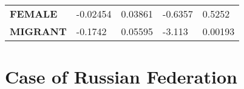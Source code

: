 \documentclass[]{article}
\begin{document}
\begin{longtable}[]{@{}lllll@{}}
\begin{minipage}[t]{0.23\columnwidth}
\textbf{FEMALE}\strut
\end{minipage} & \begin{minipage}[t]{0.14\columnwidth}\raggedright
-0.02454\strut
\end{minipage} & \begin{minipage}[t]{0.16\columnwidth}\raggedright
0.03861\strut
\end{minipage} & \begin{minipage}[t]{0.12\columnwidth}\raggedright
-0.6357\strut
\end{minipage} & \begin{minipage}[t]{0.16\columnwidth}\raggedright
0.5252\strut
\end{minipage}\tabularnewline
\begin{minipage}[t]{0.23\columnwidth}\raggedright
\textbf{MIGRANT}\strut
\end{minipage} & \begin{minipage}[t]{0.14\columnwidth}\raggedright
-0.1742\strut
\end{minipage} & \begin{minipage}[t]{0.16\columnwidth}\raggedright
0.05595\strut
\end{minipage} & \begin{minipage}[t]{0.12\columnwidth}\raggedright
-3.113\strut
\end{minipage} & \begin{minipage}[t]{0.16\columnwidth}\raggedright
0.00193\strut
\end{minipage}\tabularnewline
\bottomrule
\end{longtable}

\hypertarget{case-of-russian-federation}{%
\section{Case of Russian Federation}\label{case-of-russian-federation}}
\end{document}
